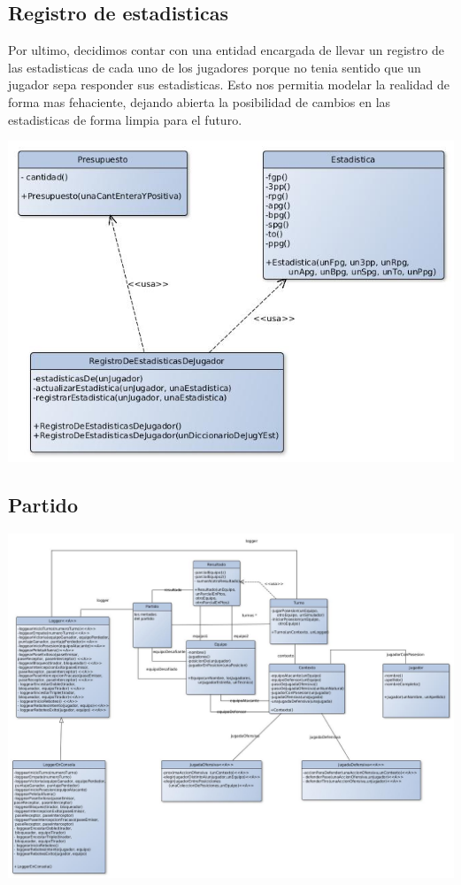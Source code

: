 \subsection{Registro de estadisticas}
Por ultimo, decidimos contar con una entidad encargada de llevar un registro de las estadisticas de cada uno de los jugadores porque no tenia sentido que un jugador sepa responder sus estadisticas. Esto nos permitia modelar la realidad de forma mas fehaciente, dejando abierta la posibilidad de cambios en las estadisticas de forma limpia para el futuro.
\begin{center}
\includegraphics[scale=0.4]{diseno/registroDeEstadisticas.jpg}
\end{center}

\subsection{Partido}
\begin{center}
\includegraphics[scale=0.4]{diseno/partido.jpg}
\end{center}

